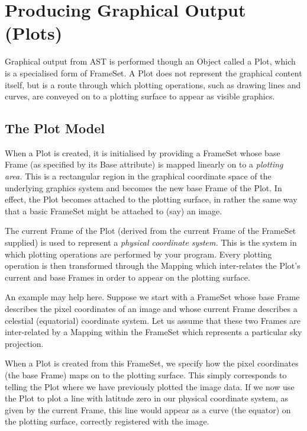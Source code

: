 \documentclass[twoside,11pt]{article}
\begin{document}
\cleardoublepage
\section{\label{ss:plots}Producing Graphical Output (Plots)}

Graphical output from AST is performed though an Object called a Plot,
which is a specialised form of FrameSet. A Plot does not represent the
graphical content itself, but is a route through which plotting
operations, such as drawing lines and curves, are conveyed on to a
plotting surface to appear as visible graphics.

\subsection{The Plot Model}

When a Plot is created, it is initialised by providing a FrameSet
whose base Frame (as specified by its Base attribute) is mapped
linearly on to a {\em{plotting area.}} This is a rectangular region in
the graphical coordinate space of the underlying graphics system and
becomes the new base Frame of the Plot. In effect, the Plot becomes
attached to the plotting surface, in rather the same way that a basic
FrameSet might be attached to (say) an image.

The current Frame of the Plot (derived from the current Frame of the
FrameSet supplied) is used to represent a {\em{physical coordinate
system.}} This is the system in which plotting operations are
performed by your program.  Every plotting operation is then
transformed through the Mapping which inter-relates the Plot's current
and base Frames in order to appear on the plotting surface.

An example may help here. Suppose we start with a FrameSet whose base
Frame describes the pixel coordinates of an image and whose current
Frame describes a celestial (equatorial) coordinate system. Let us
assume that these two Frames are inter-related by a Mapping within the
FrameSet which represents a particular sky projection.

When a Plot is created from this FrameSet, we specify how the pixel
coordinates (the base Frame) maps on to the plotting surface. This
simply corresponds to telling the Plot where we have previously
plotted the image data. If we now use the Plot to plot a line with
latitude zero in our physical coordinate system, as given by the
current Frame, this line would appear as a curve (the equator) on the
plotting surface, correctly registered with the image.
\end{document}
